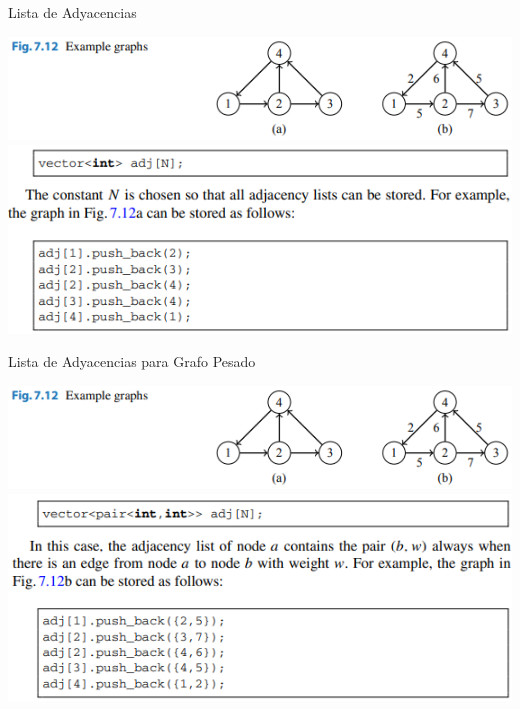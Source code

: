 \documentclass{beamer}
\begin{document}
\begin{frame}{Lista de Adyacencias}
	\begin{center}
		\includegraphics[]{figuras/7.12-grafo-ejemplo.PNG}
		\includegraphics[]{figuras/lista-de-adyacencias.PNG}
	\end{center}
\end{frame}

\begin{frame}{Lista de Adyacencias para Grafo Pesado}
	\begin{center}
		\includegraphics[]{figuras/7.12-grafo-ejemplo.PNG}
		\includegraphics[]{figuras/lista-de-ady-pesado.PNG}
	\end{center}
\end{frame}
\end{document}
